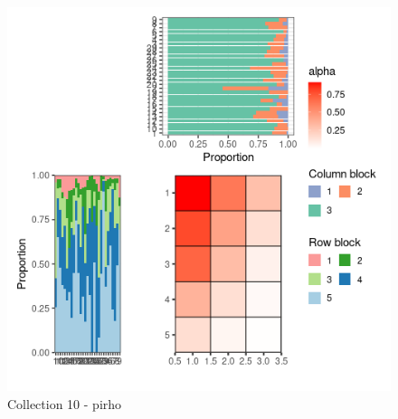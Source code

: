 \begin{figure}
\centering
\includegraphics{figure/pirho_meso_plot-10.png}
\caption{Collection 10 - pirho}
\end{figure}

